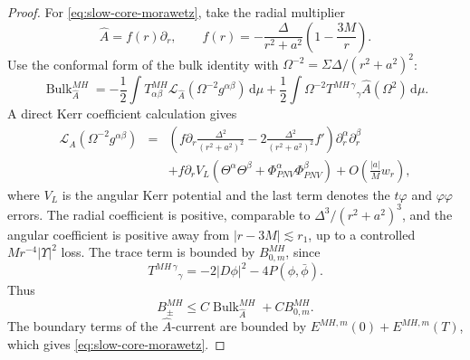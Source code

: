 \documentclass[11pt]{article}
\numberwithin{equation}{section}
\theoremstyle{plain}
\theoremstyle{definition}
\theoremstyle{remark}
\newcommand{\dd}{\mathrm{d}}
\begin{document}
\begin{proof}
For \eqref{eq:slow-core-morawetz}, take the radial multiplier
\begin{equation}
 \widehat A=f(r)\partial_r,
 \qquad
 f(r)=-\frac{\Delta}{r^2+a^2}\left(1-\frac{3M}{r}\right).
\end{equation}
Use the conformal form of the bulk identity with \(\Omega^{-2}=\Sigma\Delta/(r^2+a^2)^2\):
\begin{equation}
\operatorname{Bulk}_{\widehat A}^{MH}
=-\frac12\int T^{MH}_{\alpha\beta}\mathcal L_{\widehat A}(\Omega^{-2}g^{\alpha\beta})\,\dd\mu
+\frac12\int \Omega^{-2}T^{MH\,\gamma}{}_{\gamma}\widehat A(\Omega^2)\,\dd\mu.
\end{equation}
A direct Kerr coefficient calculation gives
\begin{eqnarray}
\mathcal L_{\widehat A}(\Omega^{-2}g^{\alpha\beta})
&=&
\left(f\partial_r\frac{\Delta^2}{(r^2+a^2)^2}
 -2\frac{\Delta^2}{(r^2+a^2)^2}f'\right)\partial_r^\alpha\partial_r^\beta
\nonumber\\
&&
+f\partial_rV_L(\Theta^\alpha\Theta^\beta+\Phi_{PNV}^\alpha\Phi_{PNV}^\beta)
+O\left(\frac{|a|}{M}w_r\right),
\end{eqnarray}
where \(V_L\) is the angular Kerr potential and the last term denotes the \(t\varphi\) and \(\varphi\varphi\) errors.  The radial coefficient is positive, comparable to \(\Delta^3/(r^2+a^2)^3\), and the angular coefficient is positive away from \(|r-3M|\lesssim r_1\), up to a controlled \(Mr^{-4}|\Upsilon|^2\) loss.  The trace term is bounded by \(B_{0,m}^{MH}\), since
\begin{equation}
 T^{MH\,\gamma}{}_{\gamma}=-2|D\phi|^2-4P(\phi,\bar\phi).
\end{equation}
Thus
\begin{equation}
 B_{\pm}^{MH}\le C\operatorname{Bulk}_{\widehat A}^{MH}+C B_{0,m}^{MH}.
\end{equation}
The boundary terms of the \(\widehat A\)-current are bounded by \(E^{MH,m}(0)+E^{MH,m}(T)\), which gives \eqref{eq:slow-core-morawetz}.


\end{proof}
\end{document}
